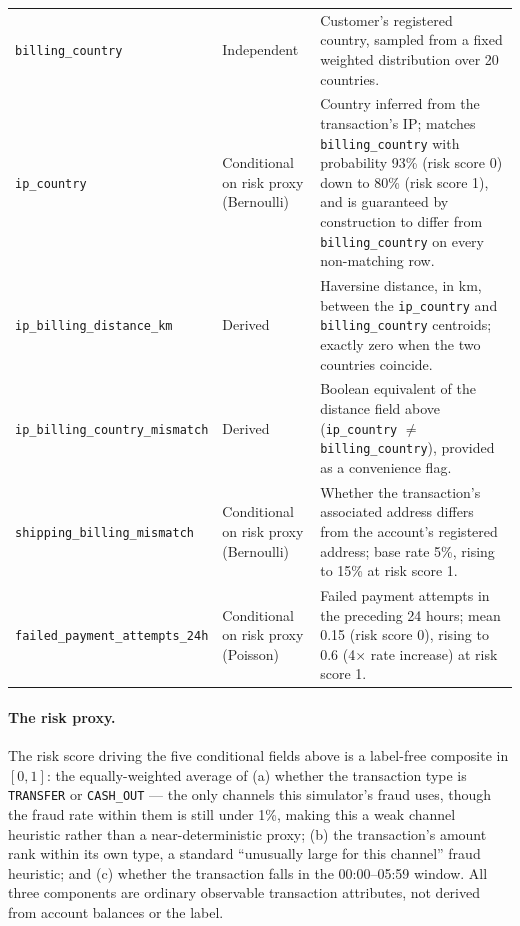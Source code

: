 \begin{table}[htbp]
\begin{tabular}{@{}llp{7cm}@{}}
\texttt{billing\_country} & Independent & Customer's registered country, sampled from a fixed weighted distribution over 20 countries. \\
\texttt{ip\_country} & Conditional on risk proxy (Bernoulli) & Country inferred from the transaction's IP; matches \texttt{billing\_country} with probability 93\% (risk score 0) down to 80\% (risk score 1), and is guaranteed by construction to differ from \texttt{billing\_country} on every non-matching row. \\
\texttt{ip\_billing\_distance\_km} & Derived & Haversine distance, in km, between the \texttt{ip\_country} and \texttt{billing\_country} centroids; exactly zero when the two countries coincide. \\
\texttt{ip\_billing\_country\_mismatch} & Derived & Boolean equivalent of the distance field above (\texttt{ip\_country} $\neq$ \texttt{billing\_country}), provided as a convenience flag. \\
\texttt{shipping\_billing\_mismatch} & Conditional on risk proxy (Bernoulli) & Whether the transaction's associated address differs from the account's registered address; base rate 5\%, rising to 15\% at risk score 1. \\
\texttt{failed\_payment\_attempts\_24h} & Conditional on risk proxy (Poisson) & Failed payment attempts in the preceding 24 hours; mean 0.15 (risk score 0), rising to 0.6 (4\(\times\) rate increase) at risk score 1. \\
\bottomrule
\end{tabular}
\end{table}

\paragraph{The risk proxy.} The risk score driving the five conditional fields above is a label-free composite in $[0,1]$: the equally-weighted average of (a) whether the transaction type is \texttt{TRANSFER} or \texttt{CASH\_OUT} --- the only channels this simulator's fraud uses, though the fraud rate within them is still under 1\%, making this a weak channel heuristic rather than a near-deterministic proxy; (b) the transaction's amount rank within its own type, a standard ``unusually large for this channel'' fraud heuristic; and (c) whether the transaction falls in the 00:00--05:59 window. All three components are ordinary observable transaction attributes, not derived from account balances or the label.

